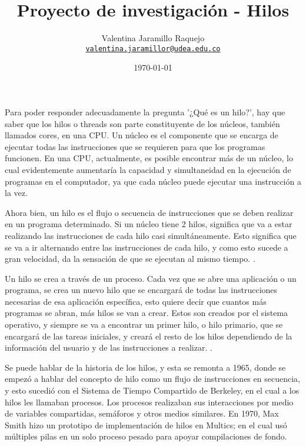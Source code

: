 \documentclass[12pt]{article}
\title{Proyecto de investigación - Hilos
}
\author{Valentina Jaramillo Raquejo\\%
    \href{mailto:valentina.jaramillor@udea.edu.co}{\texttt{valentina.jaramillor@udea.edu.co}} %
    }
\date{\today}
\begin{document}
{
\maketitle


Para poder responder adecuadamente la pregunta '¿Qué es un hilo?', hay que saber que los hilos o threads son parte constituyente de los núcleos, también llamados cores, en una CPU. Un núcleo es el componente que se encarga de ejecutar todas las instrucciones que se requieren para que los programas funcionen. En una CPU, actualmente, es posible encontrar más de un núcleo, lo cual evidentemente aumentaría la capacidad y simultaneidad en la ejecución de programas en el computador, ya que cada núcleo puede ejecutar una instrucción a la vez. 
\newline

Ahora bien, un hilo es el flujo o secuencia de instrucciones que se deben realizar en un programa determinado. Si un núcleo tiene 2 hilos, significa que va a estar realizando las instrucciones de cada hilo casi simultáneamente. Esto significa que se va a ir alternando entre las instrucciones de cada hilo, y como esto sucede a gran velocidad, da la sensación de que se ejecutan al mismo tiempo. \citep{Defini}.
\newline

Un hilo se crea a través de un proceso. Cada vez que se abre una aplicación o un programa, se crea un nuevo hilo que se encargará de todas las instrucciones necesarias de esa aplicación específica, esto quiere decir que cuantos más programas se abran, más hilos se van a crear. Estos son creados por el sistema operativo, y siempre se va a encontrar un primer hilo, o hilo primario, que se encargará de las tareas iniciales, y creará el resto de los hilos dependiendo de la información del usuario y de las instrucciones a realizar. \citep{Defini2}.
\newline

Se puede hablar de la historia de los hilos, y esta se remonta a 1965, donde se empezó a hablar del concepto de hilo como un flujo de instrucciones en secuencia, y esto sucedió con el Sistema de Tiempo Compartido de Berkeley, en el cual a los hilos les llamaban procesos.
Los procesos realizaban sus interacciones por medio de variables compartidas, semáforos y otros medios similares. En 1970, Max Smith hizo un prototipo de implementación de hilos en Multics; en el cual usó múltiples pilas en un solo proceso pesado para apoyar compilaciones de fondo.
\newline

}
\end{document}
